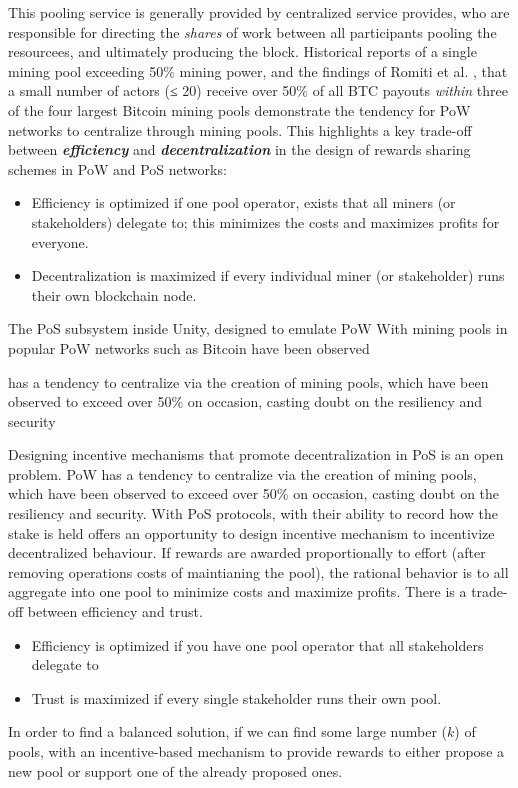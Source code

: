This pooling service is generally provided by centralized service provides, who are responsible for directing the \textit{shares} of work between all participants pooling the resourcees, and ultimately producing the block. Historical reports of a single mining pool exceeding 50\% mining power, and the findings of Romiti et al. \cite{RJZ+19}, that a small number of actors (≤ 20) receive over 50\% of all BTC payouts \textit{within} three of the four largest Bitcoin mining pools demonstrate the tendency for PoW networks to centralize through mining pools. 
This highlights a key trade-off between \textit{\textbf{efficiency}} and \textit{\textbf{decentralization}} in the design of rewards sharing schemes in PoW and PoS networks: 
\begin{itemize}
    \item Efficiency is optimized if one pool operator, exists that all miners (or stakeholders) delegate to; this minimizes the costs and maximizes profits for everyone. 
    \item Decentralization is maximized if every individual miner (or stakeholder) runs their own blockchain node. 
\end{itemize}





The PoS subsystem inside Unity, designed to emulate PoW 
With mining pools in popular PoW networks such as Bitcoin have been observed 


has a tendency to centralize via the creation of mining pools, which have been observed to exceed over 50\% on occasion, casting doubt on the resiliency and security


Designing incentive mechanisms that promote decentralization in PoS is an open problem. PoW has a tendency to centralize via the creation of mining pools, which have been observed to exceed over 50\% on occasion, casting doubt on the resiliency and security. With PoS protocols, with their ability to record how the stake is held offers an opportunity to design incentive mechanism to incentivize decentralized behaviour. If rewards are awarded proportionally to effort (after removing operations costs of maintianing the pool), the rational behavior is to all aggregate into one pool to minimize costs and maximize profits. There is a trade-off between efficiency and trust. 
\begin{itemize}
    \item Efficiency is optimized if you have one pool operator that all stakeholders delegate to
    \item Trust is maximized if every single stakeholder runs their own pool. 
\end{itemize}

In order to find a balanced solution, if we can find some large number ($k$) of pools, with an incentive-based mechanism to provide rewards to either propose a new pool or support one of the already proposed ones. 